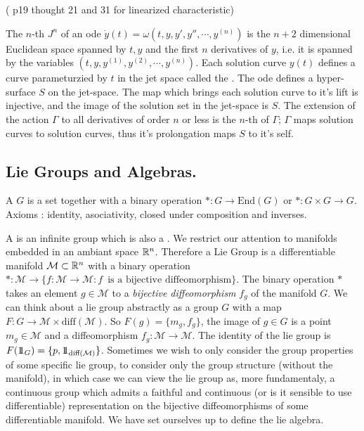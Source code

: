 \documentclass[12pt]{article}
\begin{document}
(\cite{Symmetry-methods} p19 thought 21 and 31 for linearized characteristic)

The $n$-th  $J^n$ of an ode $\dot y(t) = \omega(t,y,y',y'',\cdots,y^{(n)})$ is the $n+2$ dimensional Euclidean space spanned by $t,y$ and the first $n$ derivatives of $y$, i.e. it is spanned by the variables $(t,y,y^{(1)},y^{(2)},\cdots,y^{(n)})$. Each solution curve $y(t)$ defines a curve parameturzied by $t$ in the jet space called the . The ode defines a hyper-surface $S$ on the jet-space. The map which brings each solution curve to it's lift is injective, and the image of the solution set in the jet-space is $S$. The extension of the action $\Gamma$ to all derivatives of order $n$ or less is the $n$-th  of $\Gamma$; $\Gamma$ maps solution curves to solution curves, thus it's prolongation maps $S$ to it's self. 

\subsection{Lie Groups and Algebras.}

A  $G$ is a set together with a binary operation $\ast : G \to \text{End} (G)$ or $\ast : G\times G \to G$. Axioms : identity, asociativity, closed under composition and inverses. 

A  is an infinite group which is also a . We restrict our attention to manifolds embedded in an ambiant space $\mathbb{R}^n$. Therefore a Lie Group is a differentiable manifold $\mathcal M\subset \mathbb{R}^n$ with a binary operation $\ast : \mathcal M \to \{f:\mathcal M \to \mathcal M : f\,\text{ is a bijective diffeomorphism}\}$. The binary operation $\ast$ takes an element $g\in \mathcal M$ to a \textit{bijective diffeomorphism} $f_g$ of the manifold $G$. We can think about a lie group abstractly as a group $G$ with a map $F : G\to \mathcal M \times \text{diff} (\mathcal M)$. So $F(g) = \{m_g,f_g\}$, the image of $g\in G$ is a point $m_g\in\mathcal M$ and a diffeomorphism $f_g : \mathcal M \to \mathcal M$. The identity of the lie group is $F(1\!\!1_G) = \{p , 1\!\!1_{\text{diff}(\mathcal M)}\}$. Sometimes we wish to only consider the group properties of some specific lie group, to consider only the group structure (without the manifold), in which case we can view the lie group as, more fundamentaly, a continuous group which admits a faithful and continuous (or is it sensible to use differentiable) representation on the bijective diffeomorphisms of some differentiable manifold. We have set ourselves up to define the lie algebra. 
\end{document}
